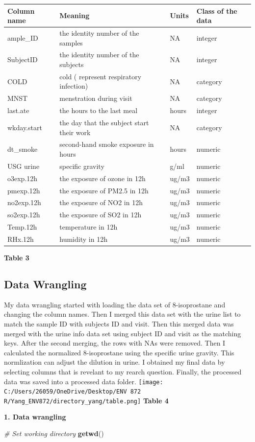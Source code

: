 \documentclass[12pt,]{article}
\newenvironment{Shaded}{\begin{snugshade}}{\end{snugshade}}
\newcommand{\CommentTok}[1]{\textcolor[rgb]{0.56,0.35,0.01}{\textit{#1}}}
\newcommand{\KeywordTok}[1]{\textcolor[rgb]{0.13,0.29,0.53}{\textbf{#1}}}
\newcommand{\NormalTok}[1]{#1}
\begin{document}
\begin{longtable}[]{@{}llll@{}}
\toprule
Column name & Meaning & Units & Class of the data\tabularnewline
\midrule
\endhead
ample\_ID & the identity number of the samples & NA &
integer\tabularnewline
SubjectID & the identity number of the subjects & NA &
integer\tabularnewline
COLD & cold ( represent respiratory infection) & NA &
category\tabularnewline
MNST & menstration during visit & NA & category\tabularnewline
last.ate & the hours to the last meal & hours & integer\tabularnewline
wkday.start & the day that the subject start their work & NA &
category\tabularnewline
dt\_smoke & second-hand smoke exposure in hours & hours &
numeric\tabularnewline
USG urine & specific gravity & g/ml & numeric\tabularnewline
o3exp.12h & the exposure of ozone in 12h & ug/m3 &
numeric\tabularnewline
pmexp.12h & the exposure of PM2.5 in 12h & ug/m3 &
numeric\tabularnewline
no2exp.12h & the exposure of NO2 in 12h & ug/m3 & numeric\tabularnewline
so2exp.12h & the exposure of SO2 in 12h & ug/m3 & numeric\tabularnewline
Temp.12h & temperature in 12h & ug/m3 & numeric\tabularnewline
RHx.12h & humidity in 12h & ug/m3 & numeric\tabularnewline
\bottomrule
\end{longtable}

\center \textbf{Table 3} \center 

\hypertarget{data-wrangling}{%
\subsection{Data Wrangling}\label{data-wrangling}}

My data wrangling started with loading the data set of 8-isoprostane and
changing the column names. Then I merged this data set with the urine
list to match the sample ID with subjects ID and visit. Then this merged
data was merged with the urine info data set using subject ID and visit
as the matching keys. After the second merging, the rows with NAs were
removed. Then I calculated the normalized 8-isoprostane using the
specific urine gravity. This normlization can adjust the dilution in
urine. I obtained my final data by selecting columns that is revelant to
my rearch question. Finally, the processed data was saved into a
processed data folder.
\texttt{[image: C:/Users/26059/OneDrive/Desktop/ENV 872 R/Yang\_ENV872/directory\_yang/table.png]}
\center \textbf{Table 4} \center 

\newpage

\textbf{1. Data wrangling}

\begin{Shaded}
\begin{Highlighting}[]
\CommentTok{# Set working directory}
\KeywordTok{getwd}\NormalTok{()}
\end{Highlighting}
\end{Shaded}
\end{document}
